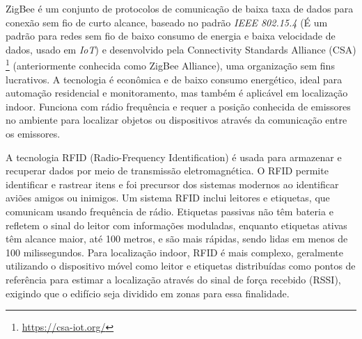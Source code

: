 \label{subsubsubsec:zigbee}
ZigBee é um conjunto de protocolos de comunicação de baixa taxa de dados para conexão sem fio de curto alcance, baseado no padrão \textit{IEEE 802.15.4} (É um padrão para redes sem fio de baixo consumo de energia e baixa velocidade de dados, usado em \textit{IoT}) e desenvolvido pela Connectivity Standards Alliance (CSA) \footnote{\url{https://csa-iot.org/}} (anteriormente conhecida como ZigBee Alliance), uma organização sem fins lucrativos.
A tecnologia é econômica e de baixo consumo energético, ideal para automação residencial e monitoramento, mas também é aplicável em localização indoor.
Funciona com rádio frequência e requer a posição conhecida de emissores no ambiente para localizar objetos ou dispositivos através da comunicação entre os emissores.

\label{subsubsubsec:rfid}
A tecnologia RFID (Radio-Frequency Identification) é usada para armazenar e recuperar dados por meio de transmissão eletromagnética.
O RFID permite identificar e rastrear itens e foi precursor dos sistemas modernos ao identificar aviões amigos ou inimigos.
Um sistema RFID inclui leitores e etiquetas, que comunicam usando frequência de rádio.
Etiquetas passivas não têm bateria e refletem o sinal do leitor com informações moduladas, enquanto etiquetas ativas têm alcance maior, até 100 metros, e são mais rápidas, sendo lidas em menos de 100 milissegundos.
Para localização indoor, RFID é mais complexo, geralmente utilizando o dispositivo móvel como leitor e etiquetas distribuídas como pontos de referência para estimar a localização através do sinal de força recebido (RSSI), exigindo que o edifício seja dividido em zonas para essa finalidade.